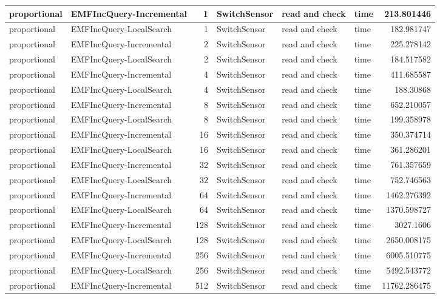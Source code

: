 \begin{table}
\begin{tabular}{| l | l | r | l | l | l | r |}
proportional & EMFIncQuery-Incremental & 1 & SwitchSensor & read and check & time & 213.801446\\\hline
proportional & EMFIncQuery-LocalSearch & 1 & SwitchSensor & read and check & time & 182.981747\\\hline
proportional & EMFIncQuery-Incremental & 2 & SwitchSensor & read and check & time & 225.278142\\\hline
proportional & EMFIncQuery-LocalSearch & 2 & SwitchSensor & read and check & time & 184.517582\\\hline
proportional & EMFIncQuery-Incremental & 4 & SwitchSensor & read and check & time & 411.685587\\\hline
proportional & EMFIncQuery-LocalSearch & 4 & SwitchSensor & read and check & time & 188.30868\\\hline
proportional & EMFIncQuery-Incremental & 8 & SwitchSensor & read and check & time & 652.210057\\\hline
proportional & EMFIncQuery-LocalSearch & 8 & SwitchSensor & read and check & time & 199.358978\\\hline
proportional & EMFIncQuery-Incremental & 16 & SwitchSensor & read and check & time & 350.374714\\\hline
proportional & EMFIncQuery-LocalSearch & 16 & SwitchSensor & read and check & time & 361.286201\\\hline
proportional & EMFIncQuery-Incremental & 32 & SwitchSensor & read and check & time & 761.357659\\\hline
proportional & EMFIncQuery-LocalSearch & 32 & SwitchSensor & read and check & time & 752.746563\\\hline
proportional & EMFIncQuery-Incremental & 64 & SwitchSensor & read and check & time & 1462.276392\\\hline
proportional & EMFIncQuery-LocalSearch & 64 & SwitchSensor & read and check & time & 1370.598727\\\hline
proportional & EMFIncQuery-Incremental & 128 & SwitchSensor & read and check & time & 3027.1606\\\hline
proportional & EMFIncQuery-LocalSearch & 128 & SwitchSensor & read and check & time & 2650.008175\\\hline
proportional & EMFIncQuery-Incremental & 256 & SwitchSensor & read and check & time & 6005.510775\\\hline
proportional & EMFIncQuery-LocalSearch & 256 & SwitchSensor & read and check & time & 5492.543772\\\hline
proportional & EMFIncQuery-Incremental & 512 & SwitchSensor & read and check & time & 11762.286475\\\hline

\end{tabular}
\end{table}

